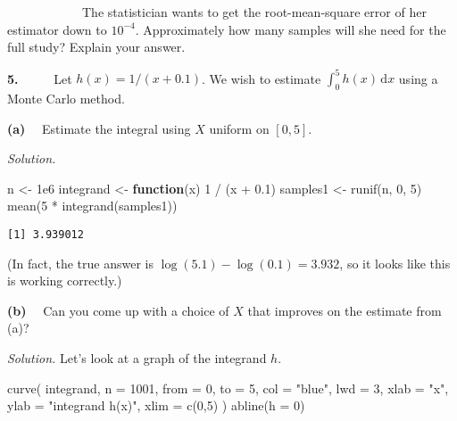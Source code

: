 \documentclass[
  letterpaper,
  DIV=11,
  numbers=noendperiod]{scrreprt}
\newenvironment{Shaded}{\begin{snugshade}}{\end{snugshade}}
\newcommand{\AttributeTok}[1]{\textcolor[rgb]{0.40,0.45,0.13}{#1}}
\newcommand{\ControlFlowTok}[1]{\textcolor[rgb]{0.00,0.23,0.31}{\textbf{#1}}}
\newcommand{\DecValTok}[1]{\textcolor[rgb]{0.68,0.00,0.00}{#1}}
\newcommand{\FloatTok}[1]{\textcolor[rgb]{0.68,0.00,0.00}{#1}}
\newcommand{\FunctionTok}[1]{\textcolor[rgb]{0.28,0.35,0.67}{#1}}
\newcommand{\NormalTok}[1]{\textcolor[rgb]{0.00,0.23,0.31}{#1}}
\newcommand{\OtherTok}[1]{\textcolor[rgb]{0.00,0.23,0.31}{#1}}
\newcommand{\SpecialCharTok}[1]{\textcolor[rgb]{0.37,0.37,0.37}{#1}}
\newcommand{\StringTok}[1]{\textcolor[rgb]{0.13,0.47,0.30}{#1}}
\theoremstyle{plain}
\theoremstyle{definition}
\theoremstyle{definition}
\theoremstyle{remark}
\begin{document}
~~~~~~~~~~~~The statistician wants to get the root-mean-square error of
her estimator down to \(10^{−4}\). Approximately how many samples will
she need for the full study? Explain your answer.

\textbf{5.} ~~~~~Let \(h(x) = 1/(x + 0.1)\). We wish to estimate
\(\int_0^5 h(x) \, \mathrm{d}x\) using a Monte Carlo method.

\textbf{(a)} ~~Estimate the integral using \(X\) uniform on \([0,5]\).

\emph{Solution.}

\begin{Shaded}
\begin{Highlighting}[]
\NormalTok{n }\OtherTok{\textless{}{-}} \FloatTok{1e6}
\NormalTok{integrand }\OtherTok{\textless{}{-}} \ControlFlowTok{function}\NormalTok{(x) }\DecValTok{1} \SpecialCharTok{/}\NormalTok{ (x }\SpecialCharTok{+} \FloatTok{0.1}\NormalTok{)}
\NormalTok{samples1 }\OtherTok{\textless{}{-}} \FunctionTok{runif}\NormalTok{(n, }\DecValTok{0}\NormalTok{, }\DecValTok{5}\NormalTok{)}
\FunctionTok{mean}\NormalTok{(}\DecValTok{5} \SpecialCharTok{*} \FunctionTok{integrand}\NormalTok{(samples1))}
\end{Highlighting}
\end{Shaded}

\begin{verbatim}
[1] 3.939012
\end{verbatim}

(In fact, the true answer is \(\log(5.1) - \log(0.1) = 3.932\), so it
looks like this is working correctly.)

\textbf{(b)} ~~Can you come up with a choice of \(X\) that improves on
the estimate from (a)?

\emph{Solution.} Let's look at a graph of the integrand \(h\).

\begin{Shaded}
\begin{Highlighting}[]
\FunctionTok{curve}\NormalTok{(}
\NormalTok{  integrand, }\AttributeTok{n =} \DecValTok{1001}\NormalTok{, }\AttributeTok{from =} \DecValTok{0}\NormalTok{, }\AttributeTok{to =} \DecValTok{5}\NormalTok{,}
  \AttributeTok{col =} \StringTok{"blue"}\NormalTok{, }\AttributeTok{lwd =} \DecValTok{3}\NormalTok{,}
  \AttributeTok{xlab =} \StringTok{"x"}\NormalTok{, }\AttributeTok{ylab =} \StringTok{"integrand h(x)"}\NormalTok{, }\AttributeTok{xlim =} \FunctionTok{c}\NormalTok{(}\DecValTok{0}\NormalTok{,}\DecValTok{5}\NormalTok{)}
\NormalTok{)}
\FunctionTok{abline}\NormalTok{(}\AttributeTok{h =} \DecValTok{0}\NormalTok{)}
\end{Highlighting}
\end{Shaded}
\end{document}
